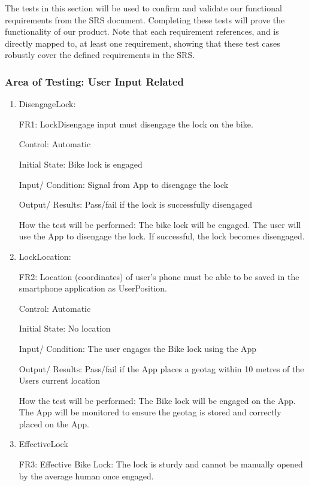 \documentclass[12pt, titlepage]{article}
\begin{document}
The tests in this section will be used to confirm and validate our functional requirements from the SRS document. Completing these tests will prove the functionality of our product. Note that each requirement references, and is directly mapped to, at least one requirement, showing that these test cases robustly cover the defined requirements in the SRS.

\subsubsection{Area of Testing: User Input Related}

\begin{enumerate}

\item{DisengageLock: 

FR1: LockDisengage input must disengage the lock on the bike. } 

Control: Automatic 

Initial State: Bike lock is engaged 

Input/ Condition: Signal from App to disengage the lock 

Output/ Results: Pass/fail if the lock is successfully disengaged  

How the test will be performed: The bike lock will be engaged. The user will use the App to disengage the lock. If successful, the lock becomes disengaged. 
 
\item{LockLocation: 

FR2: Location (coordinates) of user’s phone must be able to be saved in the smartphone application as UserPosition. } 

Control: Automatic 

Initial State: No location  

Input/ Condition: The user engages the Bike lock using the App 

Output/ Results: Pass/fail if the App places a geotag within 10 metres of the Users current location 

How the test will be performed: The Bike lock will be engaged on the App. The App will be monitored to ensure the geotag is stored and correctly placed on the App.  

\item{EffectiveLock

FR3: Effective Bike Lock: The lock is sturdy and cannot be manually opened by the average human once engaged. }


\end{enumerate}
\end{document}

